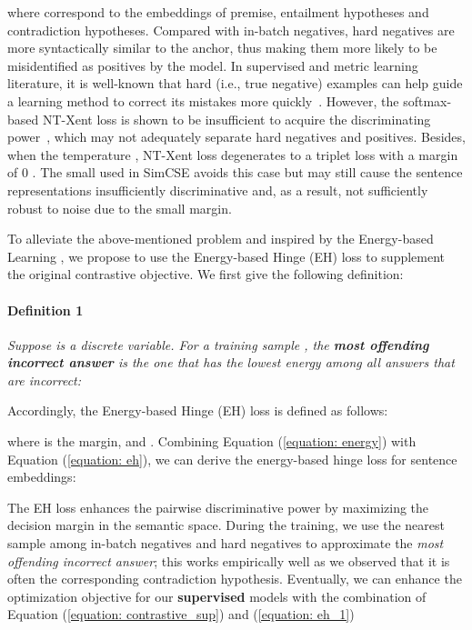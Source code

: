 \documentclass[11pt]{article}
\begin{document}
where  correspond to the embeddings of premise, entailment hypotheses and contradiction hypotheses. 
Compared with in-batch negatives, hard negatives are more syntactically similar to the anchor, thus making them more likely to be misidentified as positives by the model.
In supervised and metric learning literature, it is well-known that hard (i.e., true negative) examples can help guide a learning method to correct its mistakes more quickly~\cite{DBLP:conf/cvpr/SchroffKP15, DBLP:conf/cvpr/SongXJS16}.
However, the softmax-based NT-Xent loss is shown to be insufficient to acquire the discriminating power~\cite{DBLP:conf/cvpr/WangWZJGZL018,DBLP:conf/cvpr/DengGXZ19}, which may not adequately separate hard negatives and positives.
Besides, when the temperature , NT-Xent loss degenerates to a triplet loss with a margin of 0 \cite{WangL21a_understandcl}. The small  used in SimCSE avoids this case but may still cause the sentence representations insufficiently discriminative and, as a result, not sufficiently robust to noise due to the small margin.  

To alleviate the above-mentioned problem and inspired by the Energy-based Learning \cite{lecun2006tutorial}, we propose to use the Energy-based Hinge (EH) loss to supplement the original contrastive objective. We first give the following definition:
\paragraph{Definition 1} \textit{Suppose  is a discrete variable. For a training sample , the \textbf{most offending incorrect answer}  is the one that has the lowest energy among all answers that are incorrect:}

Accordingly, the Energy-based Hinge (EH) loss is defined as follows:

where  is the margin, and . Combining Equation (\ref{equation: energy}) with Equation (\ref{equation: eh}), we can derive the energy-based hinge loss for sentence embeddings:

The EH loss enhances the pairwise discriminative power by maximizing the decision margin  in the semantic space.
During the training, we use the nearest sample among in-batch negatives and hard negatives
to approximate the \textit{most offending incorrect answer}; this works empirically well as we observed that it is often the corresponding contradiction hypothesis. 
Eventually, we can enhance the optimization objective for our \textbf{supervised} models with the combination of Equation (\ref{equation: contrastive_sup}) and (\ref{equation: eh_1})
\end{document}

